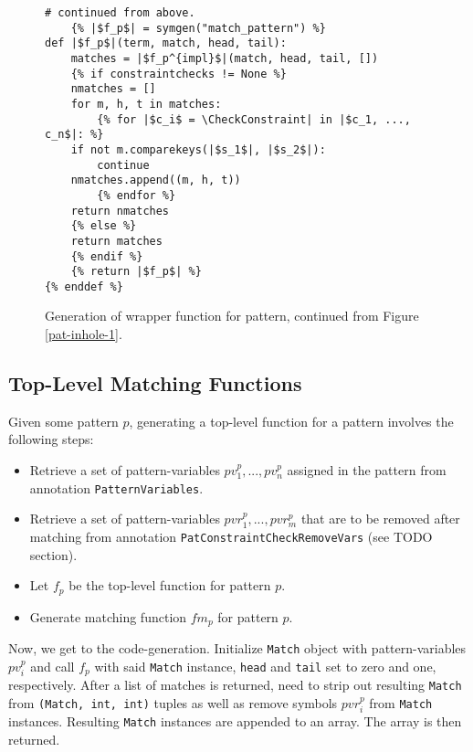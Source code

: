 \begin{figure}
\begin{verbatim}
# continued from above.
	{% |$f_p$| = symgen("match_pattern") %}
def |$f_p$|(term, match, head, tail):
	matches = |$f_p^{impl}$|(match, head, tail, [])
	{% if constraintchecks != None %}
	nmatches = []
	for m, h, t in matches:
		{% for |$c_i$ = \CheckConstraint| in |$c_1, ..., c_n$|: %}
	if not m.comparekeys(|$s_1$|, |$s_2$|):
		continue
	nmatches.append((m, h, t))
		{% endfor %}
	return nmatches
	{% else %}
	return matches
	{% endif %}
	{% return |$f_p$| %}
{% enddef %}
\end{verbatim} 
\caption{Generation of wrapper function for \PatternInHoleNoArg \space pattern, continued from Figure \ref{pat-inhole-1}.}
\label{pat-inhole-2}
\end{figure}

\subsection{Top-Level Matching Functions}
Given some pattern $p$, generating a top-level function for a pattern involves the following steps: 

\begin{itemize}
\item Retrieve a set of pattern-variables $pv_1^{p}, ..., pv_n^{p}$ assigned in the pattern from annotation \texttt{PatternVariables}.
\item Retrieve a set of pattern-variables $pvr_1^{p}, ..., pvr_m^{p}$ that are to be removed after matching from annotation \texttt{PatConstraintCheckRemoveVars} (see TODO section).
\item Let $f_p$ be the top-level function for pattern $p$.
\item Generate matching function $fm_p$ for pattern $p$.
\end{itemize}

Now, we get to the code-generation. Initialize \texttt{Match} object with pattern-variables $pv_i^{p}$ and call $f_p$ with said \texttt{Match} instance, \texttt{head} and \texttt{tail} set to zero and one, respectively. After a list of matches is returned, need to strip out resulting \texttt{Match} from \texttt{(Match, int, int)}  tuples as well as remove symbols $pvr_i^{p}$ from \texttt{Match} instances. Resulting \texttt{Match} instances are appended to an array. The array is then returned.



